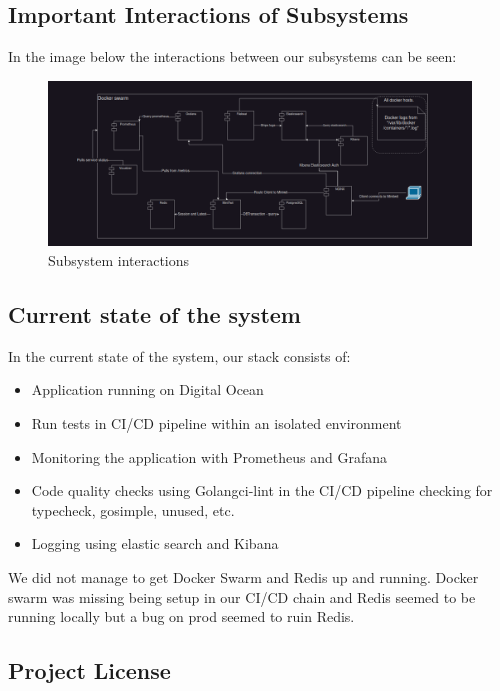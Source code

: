 \subsection{Important Interactions of Subsystems}
In the image below the interactions between our subsystems can be seen:

\begin{figure}[H]
    \centering
    \captionsetup{justification=centering,margin=1cm}
    \includegraphics[width=0.8\linewidth]{report/images/InteractionsOfSystems.png}
    \caption{Subsystem interactions}
    \label{fig:minitwit}
\end{figure}

\subsection{Current state of the system}
In the current state of the system, our stack consists of: 
\begin{itemize}
    \item Application running on Digital Ocean
    \item Run tests in CI/CD pipeline within an isolated environment
    \item Monitoring the application with Prometheus and Grafana
    \item Code quality checks using Golangci-lint in the CI/CD pipeline checking for typecheck, gosimple, unused, etc.
    \item Logging using elastic search and Kibana
\end{itemize}
We did not manage to get Docker Swarm and Redis up and running. Docker swarm was missing being setup 
in our CI/CD chain and Redis seemed to be running locally but a bug on prod seemed to ruin Redis.

\subsection{Project License}
